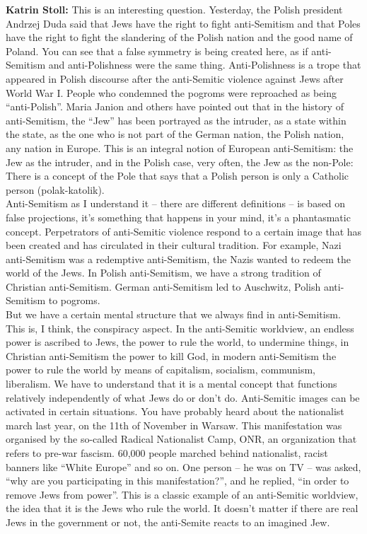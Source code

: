 \textbf{Katrin Stoll:} This is an interesting question. Yesterday, the Polish president Andrzej Duda said that Jews have the right to fight anti-Semitism and that Poles have the right to fight the slandering of the Polish nation and the good name of Poland. You can see that a false symmetry is being created here, as if anti-Semitism and anti-Polishness were the same thing. Anti-Polishness is a trope that appeared in Polish discourse after the anti-Semitic violence against Jews after World War I. People who condemned the pogroms were reproached as being ``anti-Polish''. Maria Janion and others have pointed out that in the history of anti-Semitism, the ``Jew'' has been portrayed as the intruder, as a state within the state, as the one who is not part of the German nation, the Polish nation, any nation in Europe. This is an integral notion of European anti-Semitism: the Jew as the intruder, and in the Polish case, very often, the Jew as the non-Pole: There is a concept of the Pole that says that a Polish person is only a Catholic person (polak-katolik).\\ 
Anti-Semitism as I understand it – there are different definitions – is based on false projections, it’s something that happens in your mind, it’s a phantasmatic concept. Perpetrators of anti-Semitic violence respond to a certain image that has been created and has circulated in their cultural tradition. For example, Nazi anti-Semitism was a redemptive anti-Semitism, the Nazis wanted to redeem the world of the Jews. In Polish anti-Semitism, we have a strong tradition of Christian anti-Semitism. German anti-Semitism led to Auschwitz, Polish anti-Semitism to pogroms.\\ 
But we have a certain mental structure that we always find in anti-Semitism. This is, I think, the conspiracy aspect. In the anti-Semitic worldview, an endless power is ascribed to Jews, the power to rule the world, to undermine things, in Christian anti-Semitism the power to kill God, in modern anti-Semitism the power to rule the world by means of capitalism, socialism, communism, liberalism. We have to understand that it is a mental concept that functions relatively independently of what Jews do or don’t do. Anti-Semitic images can be activated in certain situations. You have probably heard about the nationalist march last year, on the 11th of November in Warsaw. This manifestation was organised by the so-called Radical Nationalist Camp, ONR, an organization that refers to pre-war fascism. 60,000 people marched behind nationalist, racist banners like ``White Europe'' and so on. One person – he was on TV – was asked, ``why are you participating in this manifestation?'', and he replied, ``in order to remove Jews from power''. This is a classic example of an anti-Semitic worldview, the idea that it is the Jews who rule the world. It doesn’t matter if there are real Jews in the government or not, the anti-Semite reacts to an imagined Jew.\\
